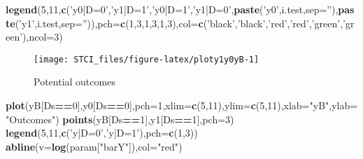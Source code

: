 \documentclass[]{book}
\newenvironment{Shaded}{\begin{snugshade}}{\end{snugshade}}
\newcommand{\DataTypeTok}[1]{\textcolor[rgb]{0.13,0.29,0.53}{#1}}
\newcommand{\DecValTok}[1]{\textcolor[rgb]{0.00,0.00,0.81}{#1}}
\newcommand{\KeywordTok}[1]{\textcolor[rgb]{0.13,0.29,0.53}{\textbf{#1}}}
\newcommand{\NormalTok}[1]{#1}
\newcommand{\OperatorTok}[1]{\textcolor[rgb]{0.81,0.36,0.00}{\textbf{#1}}}
\newcommand{\StringTok}[1]{\textcolor[rgb]{0.31,0.60,0.02}{#1}}
\theoremstyle{definition}
\theoremstyle{definition}
\theoremstyle{definition}
\theoremstyle{remark}
\begin{document}
\begin{Shaded}
\begin{Highlighting}[]
\KeywordTok{legend}\NormalTok{(}\DecValTok{5}\NormalTok{,}\DecValTok{11}\NormalTok{,}\KeywordTok{c}\NormalTok{(}\StringTok{'y0|D=0'}\NormalTok{,}\StringTok{'y1|D=1'}\NormalTok{,}\StringTok{'y0|D=1'}\NormalTok{,}\StringTok{'y1|D=0'}\NormalTok{,}\KeywordTok{paste}\NormalTok{(}\StringTok{'y0'}\NormalTok{,i.test,}\DataTypeTok{sep=}\StringTok{''}\NormalTok{),}\KeywordTok{paste}\NormalTok{(}\StringTok{'y1'}\NormalTok{,i.test,}\DataTypeTok{sep=}\StringTok{''}\NormalTok{)),}\DataTypeTok{pch=}\KeywordTok{c}\NormalTok{(}\DecValTok{1}\NormalTok{,}\DecValTok{3}\NormalTok{,}\DecValTok{1}\NormalTok{,}\DecValTok{3}\NormalTok{,}\DecValTok{1}\NormalTok{,}\DecValTok{3}\NormalTok{),}\DataTypeTok{col=}\KeywordTok{c}\NormalTok{(}\StringTok{'black'}\NormalTok{,}\StringTok{'black'}\NormalTok{,}\StringTok{'red'}\NormalTok{,}\StringTok{'red'}\NormalTok{,}\StringTok{'green'}\NormalTok{,}\StringTok{'green'}\NormalTok{),}\DataTypeTok{ncol=}\DecValTok{3}\NormalTok{)}
\end{Highlighting}
\end{Shaded}

\begin{figure}

{\centering \texttt{[image: STCI\_files/figure-latex/ploty1y0yB-1]} 

}

\caption{Potential outcomes}\label{fig:ploty1y0yB}
\end{figure}

\begin{Shaded}
\begin{Highlighting}[]
\KeywordTok{plot}\NormalTok{(yB[Ds}\OperatorTok{==}\DecValTok{0}\NormalTok{],y0[Ds}\OperatorTok{==}\DecValTok{0}\NormalTok{],}\DataTypeTok{pch=}\DecValTok{1}\NormalTok{,}\DataTypeTok{xlim=}\KeywordTok{c}\NormalTok{(}\DecValTok{5}\NormalTok{,}\DecValTok{11}\NormalTok{),}\DataTypeTok{ylim=}\KeywordTok{c}\NormalTok{(}\DecValTok{5}\NormalTok{,}\DecValTok{11}\NormalTok{),}\DataTypeTok{xlab=}\StringTok{"yB"}\NormalTok{,}\DataTypeTok{ylab=}\StringTok{"Outcomes"}\NormalTok{)}
\KeywordTok{points}\NormalTok{(yB[Ds}\OperatorTok{==}\DecValTok{1}\NormalTok{],y1[Ds}\OperatorTok{==}\DecValTok{1}\NormalTok{],}\DataTypeTok{pch=}\DecValTok{3}\NormalTok{)}
\KeywordTok{legend}\NormalTok{(}\DecValTok{5}\NormalTok{,}\DecValTok{11}\NormalTok{,}\KeywordTok{c}\NormalTok{(}\StringTok{'y|D=0'}\NormalTok{,}\StringTok{'y|D=1'}\NormalTok{),}\DataTypeTok{pch=}\KeywordTok{c}\NormalTok{(}\DecValTok{1}\NormalTok{,}\DecValTok{3}\NormalTok{))}
\KeywordTok{abline}\NormalTok{(}\DataTypeTok{v=}\KeywordTok{log}\NormalTok{(param[}\StringTok{"barY"}\NormalTok{]),}\DataTypeTok{col=}\StringTok{"red"}\NormalTok{)}
\end{Highlighting}
\end{Shaded}
\end{document}
